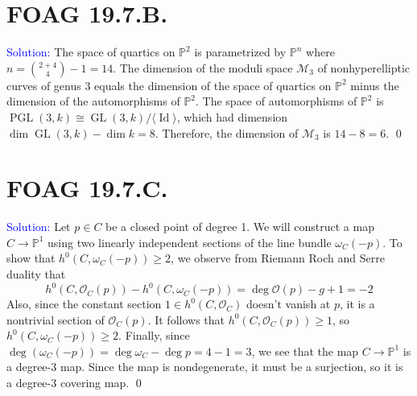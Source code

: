 \documentclass[11pt]{article}
\newcommand{\PP}{\mathbb{P}}
\newcommand{\cM}{\mathcal{M}}
\newcommand{\cO}{\mathcal{O}}
\newcommand{\Id}{\operatorname{Id}}
\newcommand{\GL}{\operatorname{GL}}
\newcommand{\PGL}{\operatorname{PGL}}
\newenvironment{solution}{\begin{trivlist}\item[]{\textcolor{blue}{Solution:}}}{\qed \end{trivlist}}
\begin{document}
\section*{FOAG 19.7.B.}

\begin{solution}
    The space of quartics on $\PP^2$ is parametrized by $\PP^{n}$ where $n = \binom{2 + 4}{4} - 1 = 14$. The dimension of the moduli space $\cM_3$ of nonhyperelliptic curves of genus 3 equals the dimension of the space of quartics on $\PP^2$ minus the dimension of the automorphisms of $\PP^2$. The space of automorphisms of $\PP^2$ is $\PGL(3, k) \cong \GL(3, k) / \langle \Id \rangle$, which had dimension $\dim \GL(3, k) - \dim k = 8$. Therefore, the dimension of $\cM_3$ is $14 - 8 = 6$. 
\end{solution}

\newpage

\section*{FOAG 19.7.C.}

\begin{solution}
    Let $p \in C$ be a closed point of degree 1. We will construct a map $C \rightarrow \PP^1$ using two linearly independent sections of the line bundle $\omega_C(-p)$. To show that $h^0(C, \omega_C(-p)) \geq 2$, we observe from Riemann Roch and Serre duality that 
    \[
        h^0(C, \cO_C(p)) - h^0(C, \omega_C(-p)) = \deg \cO(p) - g + 1
        = -2
    \]
    Also, since the constant section $1 \in h^0(C, \cO_C)$ doesn't vanish at $p$, it is a nontrivial section of $\cO_C(p)$. It follows that $h^0(C, \cO_C(p)) \geq 1$, so $h^0(C, \omega_C(-p)) \geq 2$. Finally, since $\deg(\omega_C(-p)) = \deg \omega_C - \deg p = 4 - 1 = 3$, we see that the map $C \rightarrow \PP^1$ is a degree-3 map. Since the map is nondegenerate, it must be a surjection, so it is a degree-3 covering map. 
\end{solution}
\end{document}
